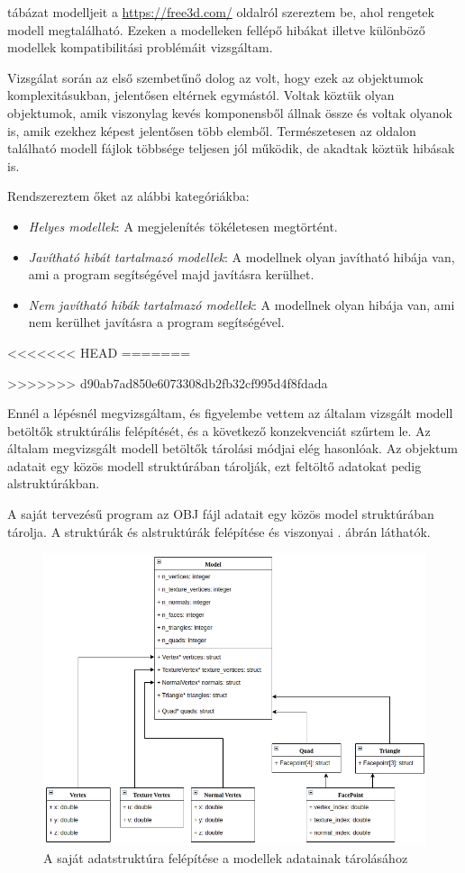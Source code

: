  tábázat modelljeit a \url{https://free3d.com/} oldalról szereztem be, ahol rengetek modell megtalálható. Ezeken a modelleken fellépő hibákat illetve különböző modellek kompatibilitási problémáit vizsgáltam.

Vizsgálat során az első szembetűnő dolog az volt, hogy ezek az objektumok komplexitásukban, jelentősen eltérnek egymástól. Voltak köztük olyan objektumok, amik viszonylag kevés komponensből állnak össze és voltak olyanok is, amik ezekhez képest jelentősen több elemből.
Természetesen az oldalon található modell fájlok többsége teljesen jól működik, de akadtak köztük hibásak is.

Rendszereztem őket az alábbi kategóriákba:
\begin{itemize}
\item \textit{Helyes modellek}:
A megjelenítés tökéletesen megtörtént.
\item \textit{Javítható hibát tartalmazó modellek}:
A modellnek olyan javítható hibája van, ami a program segítségével majd javításra kerülhet.
\item \textit{Nem javítható hibák tartalmazó modellek}:
A modellnek olyan hibája van, ami nem kerülhet javításra a program segítségével.
\end{itemize}
\bigskip
<<<<<<< HEAD
\newpage
=======

>>>>>>> d90ab7ad850e6073308db2fb32cf995d4f8fdada

Ennél a lépésnél megvizsgáltam, és figyelembe vettem az általam vizsgált modell betöltők struktúrális felépítését, és a következő konzekvenciát szűrtem le.
Az általam megvizsgált modell betöltők tárolási módjai elég hasonlóak. Az objektum adatait egy közös modell struktúrában tárolják, ezt feltöltő adatokat pedig alstruktúrákban.

A saját tervezésű program az OBJ fájl adatait egy közös model struktúrában tárolja. A struktúrák és alstruktúrák felépítése és viszonyai . ábrán láthatók.

\begin{figure}[h]
\centering
\includegraphics[width=\textwidth]{images/struct.png}
\caption{A saját adatstruktúra felépítése a modellek adatainak tárolásához}
\label{fig:struct}
\end{figure}

